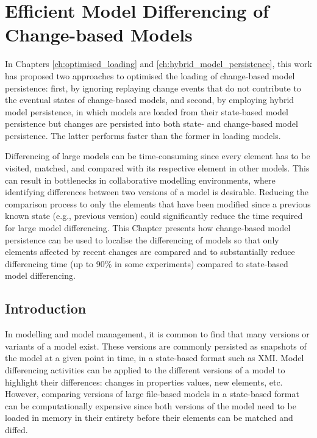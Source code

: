 \chapter{Efficient Model Differencing of Change-based Models}
\label{ch:model_differencing}


In Chapters \ref{ch:optimised_loading} and \ref{ch:hybrid_model_persistence}, this work has proposed two approaches to optimised the loading of change-based model persistence: first, by ignoring replaying change events that do not contribute to the eventual states of change-based models, and second, by employing hybrid model persistence, in which models are loaded from their state-based model persistence but changes are persisted into both state- and change-based model persistence. The latter performs faster than the former in loading models. 

Differencing of large models can be time-consuming since every element has to be visited, matched, and compared with its respective element in other models. This can result in bottlenecks in collaborative modelling environments, where identifying differences between two versions of a model is desirable. Reducing the comparison process to only the elements that have been modified since a previous known state (e.g., previous version) could significantly reduce the time required for large model differencing. This Chapter presents how change-based model persistence can be used to localise the differencing of models so that only elements affected by recent changes are compared and to substantially reduce differencing time (up to 90\% in some experiments) compared to state-based model differencing. 

\section{Introduction}
\label{sec:introduction_06}
In modelling and model management, it is common to find that many versions or variants of a model exist. These versions are commonly persisted as snapshots of the model at a given point in time, in a state-based format such as XMI. Model differencing activities can be applied to the different versions of a model to highlight their differences: changes in properties values, new elements, etc. However, comparing versions of large file-based
models in a state-based format can be computationally expensive since both versions of the model need to be loaded in memory in their entirety before their elements can be matched and diffed. 

